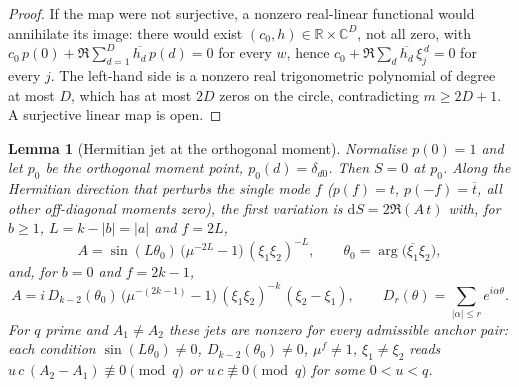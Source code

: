 \documentclass[11pt]{article}
\newtheorem{lemma}{Lemma}
\begin{document}
\begin{proof}
If the map were not surjective, a nonzero real-linear functional would annihilate its image: there
would exist $(c_0,h)\in\mathbb{R}\times\mathbb{C}^{D}$, not all zero, with
$c_0\,p(0)+\Re\sum_{d=1}^{D}\overline{h_d}\,p(d)=0$ for every $w$, hence
$c_0+\Re\sum_d\overline{h_d}\,\xi_j^{\,d}=0$ for every $j$.
The left-hand side is a nonzero real trigonometric polynomial of degree at most $D$, which has at
most $2D$ zeros on the circle, contradicting $m\ge2D+1$.
A surjective linear map is open.
\end{proof}

\begin{lemma}[Hermitian jet at the orthogonal moment]
\label{lem:orthogonal-moment-hermitian-jet}
Normalise $p(0)=1$ and let $p_0$ be the orthogonal moment point, $p_0(d)=\delta_{d0}$.
Then $S=0$ at $p_0$.
Along the Hermitian direction that perturbs the single mode $f$ ($p(f)=t$, $p(-f)=\overline t$, all
other off-diagonal moments zero), the first variation is $\mathrm{d}S=2\Re(A\,t)$ with, for
$b\ge1$, $L=k-|b|=|a|$ and $f=2L$,
\[
A
=
\sin(L\theta_0)\,\bigl(\mu^{-2L}-1\bigr)\,(\xi_1\xi_2)^{-L},
\qquad
\theta_0=\arg\bigl(\overline{\xi_1}\xi_2\bigr),
\]
and, for $b=0$ and $f=2k-1$,
\[
A
=
i\,D_{k-2}(\theta_0)\,\bigl(\mu^{-(2k-1)}-1\bigr)\,(\xi_1\xi_2)^{-k}\,(\xi_2-\xi_1),
\qquad
D_r(\theta)=\sum_{|\alpha|\le r}e^{i\alpha\theta}.
\]
For $q$ prime and $A_1\neq A_2$ these jets are nonzero for every admissible anchor pair: each
condition $\sin(L\theta_0)\neq0$, $D_{k-2}(\theta_0)\neq0$, $\mu^{f}\neq1$, $\xi_1\neq\xi_2$ reads
$u\,c\,(A_2-A_1)\not\equiv0 \pmod q$ or $u\,c\not\equiv0\pmod q$ for some $0<u<q$.
\end{lemma}
\end{document}

